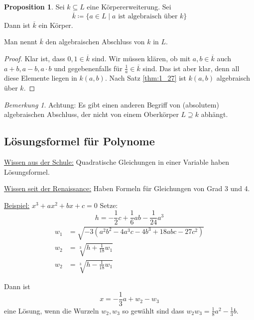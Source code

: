 \documentclass[12pt,parskip=full]{scrartcl}
\newcommand{\heading}{\underline}
\theoremstyle{definition}
\newtheorem{proposition}[theorem]{Proposition}
\theoremstyle{remark}
\newtheorem*{remark}{Bemerkung}
\begin{document}
	\begin{proposition}
		Sei $k \subseteq L$ eine Körpererweiterung. Sei
		\begin{equation*}
			\overline{k} \coloneqq \{ a \in L \mid a \text{ ist algebraisch über } k \}
		\end{equation*}
		Dann ist $\overline{k}$ ein Körper.
		
		Man nennt $\overline{k}$ den algebraischen Abschluss von $k$ in $L$.
	\end{proposition}

	\begin{proof}
		Klar ist, dass $0,1 \in \overline{k}$ sind. Wir müssen klären, ob mit $a,b \in \overline{k}$ auch $a+b, a-b, a \cdot b$ und gegebenenfalls für $\frac{1}{a} \in \overline{k}$ sind. Das ist aber klar, denn all diese Elemente liegen in $k(a,b)$. Nach Satz \ref{thm:1_27} ist $k(a,b)$ algebraisch über $k$.
	\end{proof}

	\begin{remark}
		Achtung: Es gibt einen anderen Begriff von (absolutem) algebraischen Abschluss, der nicht von einem Oberkörper $L \supseteq k$ abhängt.
	\end{remark}

	\subsection{Lösungsformel für Polynome}
	
	\heading{Wissen aus der Schule:} Quadratische Gleichungen in einer Variable haben Lösungsformel.
	
	\heading{Wissen seit der Renaissance:} Haben Formeln für Gleichungen von Grad 3 und 4.
	
	\heading{Beispiel:} $x^3 + a x^2 + bx + c = 0$ Setze:
	\begin{equation*}
		h = - \frac12 c + \frac16 a b - \frac{1}{24} a^3
	\end{equation*}
	\begin{align*}
		w_1 &= \sqrt{-3 (a^2 b^2 - 4 a^3c - 4b^3 + 18abc - 27c^2)} \\
		w_2 &= \sqrt[3]{h + \frac{1}{18} w_1} \\
		w_2 &= \sqrt[3]{h - \frac{1}{18} w_1}
	\end{align*}
	
	Dann ist
	\begin{equation*}
		x = - \frac13 a + w_2 - w_3
	\end{equation*}
	eine Lösung, wenn die Wurzeln $w_2, w_3$ so gewählt sind dass $w_2 w_3 = \frac18 a^2 - \frac13 b$.
	
\end{document}
